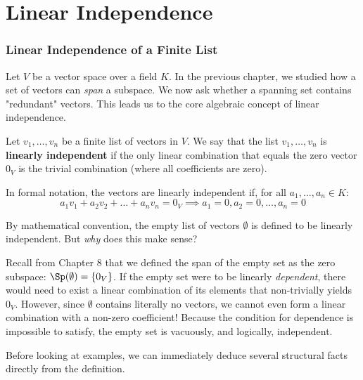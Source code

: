 \setcounter{chapter}{8}
\renewcommand{\thetheorem}{\thechapter.\arabic{theorem}}
\setcounter{theorem}{0}

\chapter{Linear Independence}

\subsection{Linear Independence of a Finite List}

Let $V$ be a vector space over a field $K$. In the previous chapter, we studied how a set of vectors can \textit{span} a subspace. We now ask whether a spanning set contains "redundant" vectors. This leads us to the core algebraic concept of linear independence.

\begin{definition}
Let $v_1, \dots, v_n$ be a finite list of vectors in $V$. We say that the list $v_1, \dots, v_n$ is \textbf{linearly independent} if the only linear combination that equals the zero vector $0_V$ is the trivial combination (where all coefficients are zero). 

In formal notation, the vectors are linearly independent if, for all $a_1, \dots, a_n \in K$:
\[
a_1 v_1 + a_2 v_2 + \dots + a_n v_n = 0_V \implies a_1 = 0, a_2 = 0, \dots, a_n = 0
\]
\end{definition}

\begin{remark}
By mathematical convention, the empty list of vectors $\emptyset$ is defined to be linearly independent. But \textit{why} does this make sense? 

Recall from Chapter 8 that we defined the span of the empty set as the zero subspace: $\Sp(\emptyset) = \{0_V\}$. If the empty set were to be linearly \textit{dependent}, there would need to exist a linear combination of its elements that non-trivially yields $0_V$. However, since $\emptyset$ contains literally no vectors, we cannot even form a linear combination with a non-zero coefficient! Because the condition for dependence is impossible to satisfy, the empty set is vacuously, and logically, independent.
\end{remark}

Before looking at examples, we can immediately deduce several structural facts directly from the definition.

